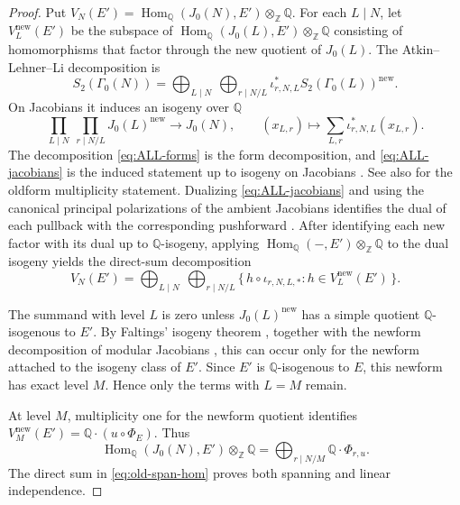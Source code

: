 \documentclass[12pt, letterpaper]{amsart}
\theoremstyle{definition}
\theoremstyle{remark}
\newcommand{\Q}{\mathbb Q}
\newcommand{\Z}{\mathbb Z}
\newcommand{\Hom}{\operatorname{Hom}}
\numberwithin{equation}{section}
\begin{document}
\begin{proof}
Put \(V_N(E')=\Hom_\Q(J_0(N),E')\otimes_\Z\Q\).
For each \(L\mid N\), let \(V_L^{\mathrm{new}}(E')\) be the subspace of
\(\Hom_\Q(J_0(L),E')\otimes_\Z\Q\) consisting of homomorphisms that factor
through the new quotient of \(J_0(L)\).
The Atkin--Lehner--Li decomposition is
\begin{equation}\label{eq:ALL-forms}
        S_2(\Gamma_0(N))=
        \bigoplus_{L\mid N}\ \bigoplus_{r\mid N/L}
        \iota_{r,N,L}^{*}S_2(\Gamma_0(L))^{\mathrm{new}}.
\end{equation}
On Jacobians it induces an isogeny over \(\Q\)
\begin{equation}\label{eq:ALL-jacobians}
        \prod_{L\mid N}\ \prod_{r\mid N/L}J_0(L)^{\mathrm{new}}
        \longrightarrow J_0(N),
        \qquad
        (x_{L,r})\longmapsto
        \sum_{L,r}\iota_{r,N,L}^{*}(x_{L,r}).
\end{equation}
The decomposition \eqref{eq:ALL-forms} is the form decomposition, and
\eqref{eq:ALL-jacobians} is the induced statement up to isogeny on Jacobians
\cite{AtkinLehner,Li,Stein}. See also \cite{DiamondShurman} for the
oldform multiplicity statement. Dualizing \eqref{eq:ALL-jacobians} and using
the canonical principal polarizations of the ambient Jacobians identifies the
dual of each pullback with the corresponding pushforward
\cite{ConradEdixhovenStein}. After identifying each new factor with its
dual up to \(\Q\)-isogeny, applying
\(\Hom_\Q(-,E')\otimes_\Z\Q\) to the dual isogeny yields the direct-sum
decomposition
\[
        V_N(E')
        =
        \bigoplus_{L\mid N}\ \bigoplus_{r\mid N/L}
        \{\,h\circ\iota_{r,N,L,*}:h\in V_L^{\mathrm{new}}(E')\,\}.
\]

The summand with level \(L\) is zero unless \(J_0(L)^{\mathrm{new}}\) has a
simple quotient \(\Q\)-isogenous to \(E'\). By Faltings' isogeny theorem
\cite{Faltings}, together with the newform decomposition of modular Jacobians
\cite{Stein}, this can occur only for the newform attached to the
isogeny class of \(E'\). Since \(E'\) is \(\Q\)-isogenous to \(E\), this newform
has exact level \(M\). Hence only the terms with \(L=M\) remain.

At level \(M\), multiplicity one for the newform quotient
\cite{AtkinLehner,Li,Stein} identifies
\(V_M^{\mathrm{new}}(E')=\Q\cdot(u\circ\Phi_E)\).
Thus
\begin{equation}\label{eq:old-span-hom}
        \Hom_\Q(J_0(N),E')\otimes_\Z\Q
        =\bigoplus_{r\mid N/M}\Q\cdot
        \Phi_{r,u}.
\end{equation}
The direct sum in \eqref{eq:old-span-hom} proves both spanning and linear
independence.
\end{proof}
\end{document}

